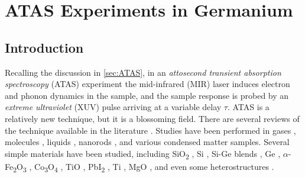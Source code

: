 \chapter{ATAS Experiments in Germanium}
\label{chap:ATAS_in_Ge}


\section{Introduction}
Recalling the discussion in \cref{sec:ATAS}, in an \textit{attosecond transient absorption spectroscopy} (ATAS) experiment the mid-infrared (MIR) laser induces electron and phonon dynamics in the sample, and the sample response is probed by an \textit{extreme ultraviolet} (XUV) pulse arriving at a variable delay $\tau$. ATAS is a relatively new technique, but it is a blossoming field. There are several reviews of the technique available in the literature \cite{beckProbingUltrafastDynamics2015,leoneWhatWillIt2014,changAttosecondOpticsTechnology2016,ramaseshaRealTimeProbingElectron2016,geneauxTransientAbsorptionSpectroscopy2019}. Studies have been performed in gases \cite{goulielmakisRealtimeObservationValence2010,wangAttosecondTimeResolvedAutoionization2010,caoAttosecondTransientAbsorption2016,chewAttosecondTransientAbsorption2018,chenLightinducedStatesAttosecond2012,bellIntensityDependenceLightinduced2013,linStrongfieldInducedXUV2012,bernhardtHighspectralresolutionAttosecondAbsorption2014,liInvestigationCouplingMechanisms2015,beckAttosecondTransientAbsorption2014}, molecules \cite{hoslerCharacterizationVibrationalWave2013,attarCoretovalenceSpectroscopicDetection2014,warrickProbingDynamicsRydberg2016}, liquids \cite{ziemkiewiczFemtosecondTimeresolvedXUV2014}, nanorods \cite{porterPhotoexcitedSmallPolaron2018}, and various condensed matter samples. Several simple materials have been studied, including SiO\textsubscript{2} \cite{schultzeControllingDielectricsElectric2013}, Si \cite{schultzeAttosecondBandgapDynamics2014,cushingDifferentiatingPhotoexcitedCarrier2019}, Si-Ge blends \cite{zurchUltrafastCarrierThermalization2017}, Ge \cite{zurchDirectSimultaneousObservation2017,kaplanFemtosecondTrackingCarrier2018}, $\alpha$-Fe\textsubscript{2}O\textsubscript{3} \cite{vura-weisFemtosecondEdgeSpectroscopy2013}, Co\textsubscript{3}O\textsubscript{4} \cite{jiangCharacterizationPhotoInducedCharge2014}, TiO \cite{vaidaFemtosecondExtremeUltraviolet2016}, PbI\textsubscript{2} \cite{linCarrierSpecificFemtosecondXUV2017}, Ti \cite{volkovAttosecondScreeningDynamics2019}, MgO \cite{geneauxAttosecondTimeDomainMeasurement2020}, and even some heterostructures \cite{marshUltrafastTimeresolvedExtreme2018,cushingLayerresolvedUltrafastExtreme2020}.

